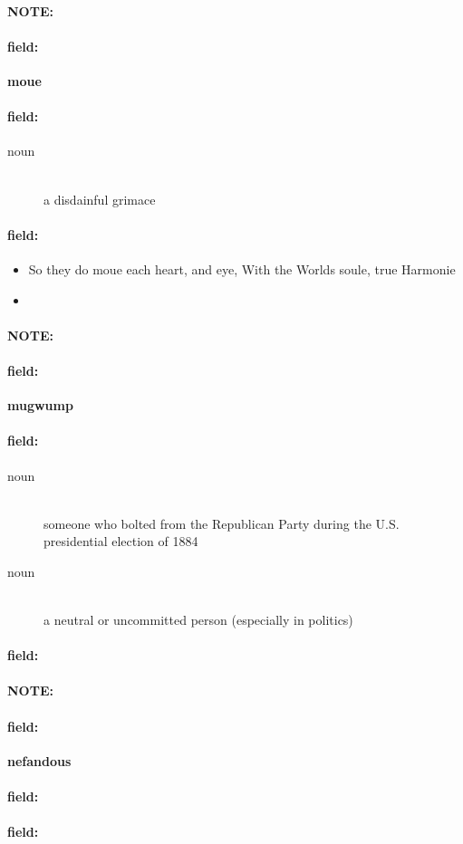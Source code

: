 \documentclass[12pt]{article}
\newenvironment{note}{\paragraph{NOTE:}}{}
\newenvironment{field}{\paragraph{field:}}{}
\begin{document}
\begin{note}
\begin{field}
\textbf{\large moue}
\end{field}


\begin{field}
\begin{description}
\item[noun] \hfill \\ 
a disdainful grimace

\end{description}
\end{field}

\begin{field}
\begin{itemize}
\item So they do moue each heart, and eye, With the Worlds soule, true Harmonie
\item 
\end{itemize}
\end{field}
\end{note}
\begin{note}
\begin{field}
\textbf{\large mugwump}
\end{field}


\begin{field}
\begin{description}
\item[noun] \hfill \\ 
someone who bolted from the Republican Party during the U.S. presidential election of 1884

\item[noun] \hfill \\ 
a neutral or uncommitted person (especially in politics)

\end{description}
\end{field}

\begin{field}
\end{field}
\end{note}
\begin{note}
\begin{field}
\textbf{\large nefandous}
\end{field}


\begin{field}
\end{field}

\begin{field}
\end{field}
\end{note}
\end{document}
